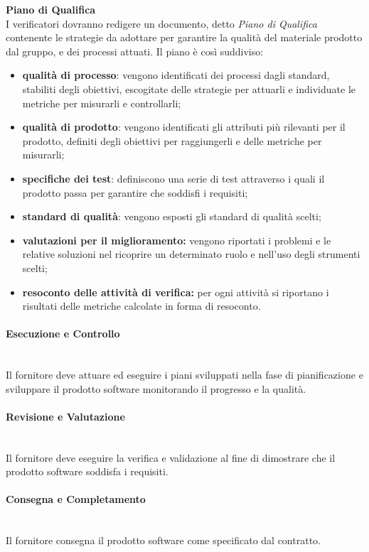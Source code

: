 			\noindent\textbf{Piano di Qualifica} \mbox{}\\
			
			\noindent I verificatori dovranno redigere un documento, detto \textit{Piano di 
				Qualifica} contenente le strategie da adottare per garantire la qualità del 
			materiale prodotto dal gruppo, e dei processi attuati. Il piano è così 
			suddiviso:
			\begin{itemize}
				\item \textbf{qualità di processo}: vengono identificati dei processi dagli 
				standard, stabiliti degli obiettivi, escogitate delle strategie per 
				attuarli e 			
				individuate le metriche per misurarli e controllarli;
				\item \textbf{qualità di prodotto}: vengono identificati gli attributi più 
				rilevanti per il prodotto, definiti degli obiettivi per raggiungerli e 
				delle 
				metriche per misurarli;
				\item \textbf{specifiche dei test}: definiscono una serie di test 
				attraverso 
				i quali il prodotto passa per garantire che soddisfi i requisiti;
				\item \textbf{standard di qualità}: vengono esposti gli standard di qualità 
				scelti;
				\item \textbf{valutazioni per il miglioramento:} vengono riportati i 
				problemi 
				e le relative soluzioni nel ricoprire un determinato ruolo e nell'uso degli 
				strumenti scelti;
				\item \textbf{resoconto delle attività di verifica:} per ogni attività si 
				riportano i risultati delle metriche calcolate in forma di resoconto.
			\end{itemize}

		\paragraph{Esecuzione e Controllo} \mbox{}\\
		Il fornitore deve attuare ed eseguire i piani sviluppati nella fase di 
		pianificazione e sviluppare il prodotto software monitorando il progresso e la 
		qualità.
		\paragraph{Revisione e Valutazione} \mbox{}\\
		Il fornitore deve eseguire la verifica e validazione al fine di dimostrare che 
		il prodotto software soddisfa i requisiti.
		\paragraph{Consegna e Completamento} \mbox{}\\
		Il fornitore consegna il prodotto software come specificato dal contratto.	

